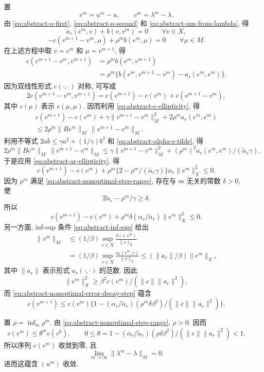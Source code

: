 \begin{Proof}
置
\[
e^m=u^m-u,
\qquad
v^m=\lambda^m-\lambda.
\]
由 
\eqref{eq:abstract-q-first},
\eqref{eq:abstract-q-second} 和
\eqref{eq:abstract-um-from-lambda}, 得
\[
a_r(e^m,v)+b(v,v^m)=0
\qquad\forall v\in X,
\]
\[
-c(v^{m+1}-v^m,\mu)+\rho^mb(e^m,\mu)=0
\qquad\forall\mu\in M.
\]
在上述方程中取 $v=e^m$ 和 $\mu=v^{m+1}$, 得
\[
\begin{aligned}
c(v^{m+1}-v^m,v^{m+1})
&=\rho^m b(e^m,v^{m+1})\\
&=\rho^m\{b(e^m,v^{m+1}-v^m)-a_r(e^m,e^m)\}.
\end{aligned}
\]
因为双线性形式 $c(\cdot,\cdot)$ 对称, 可写成
\[
2c(v^{m+1}-v^m,v^{m+1})
=c(v^{m+1})-c(v^m)+c(v^{m+1}-v^m),
\]
其中 $c(\mu)$ 表示 $c(\mu,\mu)$. 因而利用
\eqref{eq:abstract-c-ellipticity}, 得
\[
\begin{aligned}
c(v^{m+1})-c(v^m)
+\gamma\|v^{m+1}-v^m\|_M^2
+2\rho^m a_r(e^m,e^m)\\
\le2\rho^m\|Be^m\|_{M'}
\|v^{m+1}-v^m\|_M.
\end{aligned}
\]
利用不等式 $2ab\le\gamma a^2+(1/\gamma)b^2$ 和
\eqref{eq:abstract-alpha-r-tilde}, 得
\[
2\rho^m\|Be^m\|_{M'}\|v^{m+1}-v^m\|_M
\le\gamma\|v^{m+1}-v^m\|_M^2
+(\rho^m)^2a_r(e^m,e^m)/(\widetilde\alpha_r\gamma).
\]
于是应用 
\eqref{eq:abstract-ar-ellipticity}, 得
\[
c(v^{m+1})-c(v^m)
+\rho^m\{2-\rho^m/(\widetilde\alpha_r\gamma)\}
\alpha_r\|e^m\|_X^2\le0.
\]
因为 $\rho^m$ 满足 
\eqref{eq:abstract-nonoptimal-step-range},
存在与 $m$ 无关的常数 $\delta>0$, 使
\[
2\widetilde\alpha_r-\rho^m/\gamma\ge\delta.
\]
所以
\begin{equation}\label{eq:abstract-nonoptimal-error-decay-step}
c(v^{m+1})-c(v^m)
+\rho^m\delta(\alpha_r/\widetilde\alpha_r)
\|e^m\|_X^2\le0.
\end{equation}
另一方面, inf-sup 条件 
\eqref{eq:abstract-inf-sup} 给出
\[
\begin{aligned}
\|v^m\|_M
&\le(1/\beta)\sup_{v\in X}
\frac{b(v,v^m)}{\|v\|_X}\\
&=(1/\beta)\sup_{v\in X}
\frac{a_r(e^m,v)}{\|v\|_X}
\le(\|a_r\|/\beta)\|e^m\|_X,
\end{aligned}
\]
其中 $\|a_r\|$ 表示形式 $a_r(\cdot,\cdot)$ 的范数. 因此
\[
\|e^m\|_X^2
\ge\beta^2c(v^m)/(\|c\|\|a_r\|^2),
\]
而 
\eqref{eq:abstract-nonoptimal-error-decay-step} 蕴含
\[
c(v^{m+1})\le c(v^m)
\{1-(\alpha_r/\widetilde\alpha_r)
(\rho^m\delta\beta^2)/(\|c\|\|a_r\|^2)\}.
\]

置 $\rho=\inf_m\rho^m$. 由
\eqref{eq:abstract-nonoptimal-step-range}, $\rho>0$. 因而
\begin{equation}\label{eq:abstract-linear-error-decay}
c(v^m)\le\theta^m c(v^0),
\qquad
0\le\theta=1-(\alpha_r/\widetilde\alpha_r)
(\rho\delta\beta^2)/(\|c\|\|a_r\|^2)<1.
\end{equation}
所以序列 $c(v^m)$ 收敛到零, 且
\[
\lim_{m\to\infty}\|\lambda^m-\lambda\|_M=0.
\]
进而这蕴含 $(u^m)$ 收敛.
\end{Proof}

